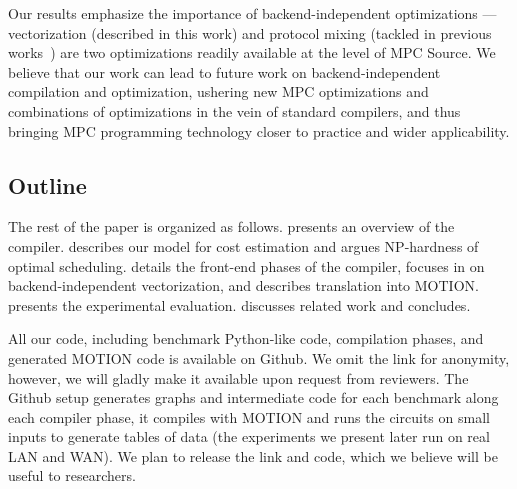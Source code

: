 Our results emphasize the importance of backend-independent optimizations --- vectorization (described in this work) and protocol mixing (tackled in previous works~\cite{Buscher:2018b,Ishaq:2019, Fang:2022}) are two optimizations readily available at the level of MPC Source. We believe that our work can lead to future work on backend-independent compilation and optimization, ushering new MPC optimizations and combinations of optimizations in the vein of standard compilers, and thus bringing MPC programming technology closer to practice and wider applicability.

\subsection{Outline}

The rest of the paper is organized as follows.  presents an overview of the compiler.  describes our model for cost estimation and argues NP-hardness of optimal scheduling.  details the front-end phases of the compiler,  focuses in on backend-independent vectorization, and  describes translation into MOTION.  presents the experimental evaluation. discusses related work and  concludes.

All our code, including benchmark Python-like code, compilation phases, and generated MOTION code is available on Github. We omit the link for anonymity, 
however, we will gladly make it available upon request from reviewers. The Github setup generates graphs and intermediate code for each benchmark along each compiler phase, it compiles with 
MOTION and runs the circuits on small inputs to generate tables of data (the experiments we present later run on real LAN and WAN). We plan to release the link and code, which we believe will be useful to researchers.

